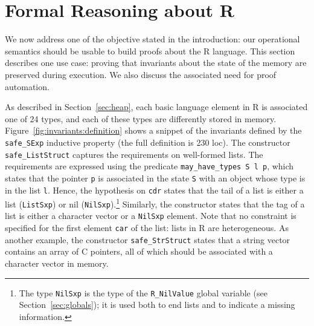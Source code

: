 \documentclass[
    sigplan,
    10pt,
    review, %
    natbib=false %
 ]{acmart}
\newcommand\CoqR{CoqR}
\begin{document}
%



\section{Formal Reasoning about R}
\label{sec:proofs}

We now address one of the objective stated in the introduction:
our operational semantics should be usable to build proofs about the R language. This section describes one use case:
proving that invariants about the state of the memory are preserved during execution. We also discuss the associated need for proof automation.

As described in Section~\ref{sec:heap},
each basic language element in R is associated one of 24 types,
and each of these types are differently stored in memory.
Figure~\ref{fig:invariants:definition} shows a snippet
of the invariants defined by the \texttt{safe_SExp} inductive property (the full definition is 230 loc).
%
The constructor \texttt{safe_ListStruct} captures the requirements on well-formed lists. The requirements are expressed using the predicate \texttt{may_have_types S l p}, which
states that the pointer \texttt{p}
is associated in the state \texttt{S} with an object
whose type is in the list \texttt{l}. Hence, the hypothesis on \texttt{cdr} states that the tail of a list is either a list
(\texttt{ListSxp}) or nil (\texttt{NilSxp}).\footnote{The type \texttt{NilSxp} is the type of the \texttt{R_NilValue} global variable (see Section~\ref{sec:globals}); it is used both to end lists and to indicate a missing information.}
Similarly, the constructor states that the tag
of a list is either a character vector or a \texttt{NilSxp} element.
Note that no constraint is specified for the first element \texttt{car} of the list: lists in R are heterogeneous.
%
As another example, the constructor \texttt{safe_StrStruct} states that a string vector contains an array of C pointers,
all of which should be associated with a character vector in memory.
\end{document}
